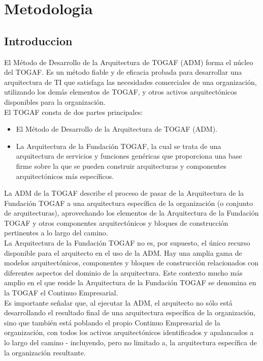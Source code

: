 \chapter{Metodologia}
\section{Introduccion}

El Método de Desarrollo de la Arquitectura de TOGAF (ADM) forma el núcleo del TOGAF.  Es un método fiable y de eficacia probada para desarrollar una arquitectura de TI que satisfaga las necesidades comerciales de una organización, utilizando los demás elementos de TOGAF, y otros activos arquitectónicos disponibles para la organización. \\

El TOGAF consta de dos partes principales:

\begin{itemize}
	\item    El Método de Desarrollo de la Arquitectura de TOGAF (ADM).
	\item La Arquitectura de la Fundación TOGAF, la cual se trata de una arquitectura de servicios y funciones genéricas que proporciona una base firme sobre la que se pueden construir arquitecturas y componentes arquitectónicos más específicos.
\end{itemize}

La ADM de la TOGAF describe el proceso de pasar de la Arquitectura de la Fundación TOGAF a una arquitectura específica de la organización (o conjunto de arquitecturas), aprovechando los elementos de la Arquitectura de la Fundación TOGAF y otros componentes arquitectónicos y bloques de construcción pertinentes a lo largo del camino.\\

La Arquitectura de la Fundación TOGAF no es, por supuesto, el único recurso disponible para el arquitecto en el uso de la ADM. Hay una amplia gama de modelos arquitectónicos, componentes y bloques de construcción relacionados con diferentes aspectos del dominio de la arquitectura. Este contexto mucho más amplio en el que reside la Arquitectura de la Fundación TOGAF se denomina en la TOGAF el Continuo Empresarial.\\

Es importante señalar que, al ejecutar la ADM, el arquitecto no sólo está desarrollando el resultado final de una arquitectura específica de la organización, sino que también está poblando el propio Continuo Empresarial de la organización, con todos los activos arquitectónicos identificados y apalancados a lo largo del camino - incluyendo, pero no limitado a, la arquitectura específica de la organización resultante.\\

